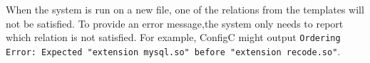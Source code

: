 When the system is run on a new file, one of the relations from the templates will not be satisfied.
To provide an error message,the system only needs to report which relation is not satisfied.
For example, ConfigC might output \texttt{Ordering Error: Expected "extension mysql.so" before "extension recode.so"}.

